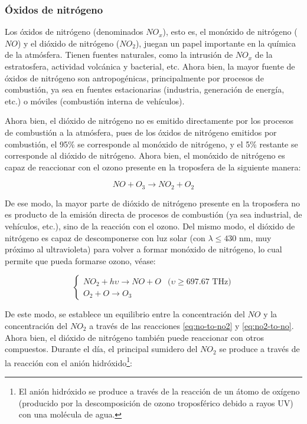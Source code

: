 \documentclass[12pt]{article}
\begin{document}
\subsubsection{Óxidos de nitrógeno}

Los óxidos de nitrógeno (denominados $NO_{x}$), esto es, el monóxido de nitrógeno ($NO$) y el dióxido de nitrógeno ($NO_{2}$), juegan un papel importante en la química de la atmósfera. Tienen fuentes naturales, como la intrusión de $NO_{x}$ de la estratosfera, actividad volcánica y bacterial, etc. Ahora bien, la mayor fuente de óxidos de nitrógeno son antropogénicas, principalmente por procesos de combustión, ya sea en fuentes estacionarias (industria, generación de energía, etc.) o móviles (combustión interna de vehículos).

Ahora bien, el dióxido de nitrógeno no es emitido directamente por los procesos de combustión a la atmósfera, pues de los óxidos de nitrógeno emitidos por combustión, el 95\% se corresponde al monóxido de nitrógeno, y el 5\% restante se corresponde al dióxido de nitrógeno. Ahora bien, el monóxido de nitrógeno es capaz de reaccionar con el ozono presente en la troposfera de la siguiente manera:

\begin{equation}
NO + O_{3} \rightarrow NO_{2} + O_{2}
\label{eq:no-to-no2}
\end{equation}

De ese modo, la mayor parte de dióxido de nitrógeno presente en la troposfera no es producto de la emisión directa de procesos de combustión (ya sea industrial, de vehículos, etc.), sino de la reacción con el ozono. Del mismo modo, el dióxido de nitrógeno es capaz de descomponerse con luz solar (con $\lambda \leq 430$ nm, muy próximo al ultravioleta) para volver a formar monóxido de nitrógeno, lo cual permite que pueda formarse ozono, véase:

\begin{equation}
\begin{cases}
NO_{2} + h\upsilon \rightarrow NO + O &\text{($\upsilon \geq 697.67$ THz)}\\
O_{2} + O \rightarrow O_{3} & 
\end{cases} 
\label{eq:no2-to-no}
\end{equation}

De este modo, se establece un equilibrio entre la concentración del $NO$ y la concentración del $NO_{2}$ a través de las reacciones \ref{eq:no-to-no2} y \ref{eq:no2-to-no}. Ahora bien, el dióxido de nitrógeno también puede reaccionar con otros compuestos. Durante el día, el principal sumidero del $NO_{2}$ se produce a través de la reacción con el anión hidróxido\footnote{El anión hidróxido se produce a través de la reacción de un átomo de oxígeno (producido por la descomposición de ozono troposférico debido a rayos UV) con una molécula de agua.}:
\end{document}
